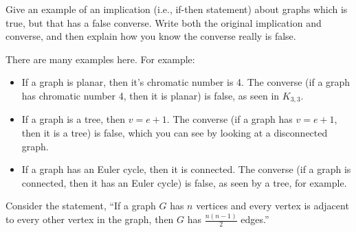 \documentclass[12pt]{exam}
\begin{document}
\begin{questions}
\question[10] Give an example of an implication (i.e., if-then statement) about graphs which is true, but that has a false converse.  Write both the original implication and converse, and then explain how you know the converse really is false.

\begin{solution}
	There are many examples here.  For example:
	\begin{itemize}
		\item If a graph is planar, then it's chromatic number is 4.  The converse (if a graph has chromatic number 4, then it is planar) is false, as seen in $K_{3,3}$.
		\item If a graph is a tree, then $v = e+1$.  The converse (if a graph has $v = e+1$, then it is a tree) is false, which you can see by looking at a disconnected graph.
		\item If a graph has an Euler cycle, then it is connected.  The converse (if a graph is connected, then it has an Euler cycle) is false, as seen by a tree, for example.
	\end{itemize}
\end{solution}

\question[20] Consider the statement, ``If a graph $G$ has $n$ vertices and every vertex is adjacent to every other vertex in the graph, then $G$ has $\frac{n(n-1)}{2}$ edges.''
\end{questions}
\end{document}
